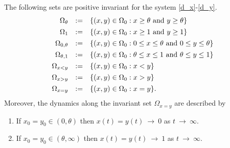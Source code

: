 \begin{lemma}
\label{th:invariant}
 The following sets are positive invariant for the system \eqref{d_x}-\eqref{d_y}.
 $$ \begin{array}{rcl}
    \Omega_{\theta}    & := & \{(x, y) \in \Omega_0 : x \geq \theta \ \hbox{and} \ y \geq \theta \} \vspace{4pt} \\
    \Omega_1           & := & \{(x, y) \in \Omega_0 : x \geq 1 \ \hbox{and} \ y \geq 1 \} \vspace{4pt} \\
    \Omega_{0, \theta} & := & \{(x, y) \in \Omega_0 : 0 \leq x \leq \theta \ \hbox{and} \ 0 \leq y \leq \theta \} \vspace{4pt} \\
    \Omega_{\theta, 1} & := & \{(x, y) \in \Omega_0 : \theta \leq x \leq 1 \ \hbox{and} \ \theta \leq y \leq 1 \} \vspace{4pt} \\
    \Omega_{x < y}     & := & \{(x, y) \in \Omega_0 : x < y \} \vspace{4pt} \\
    \Omega_{x > y}     & := & \{(x, y) \in \Omega_0 : x > y \} \vspace{4pt} \\
    \Omega_{x = y}     & := & \{(x, y) \in \Omega_0 : x = y \}. \end{array} $$
 Moreover, the dynamics along the invariant set $\Omega_{x = y}$ are described by
\begin{enumerate}
 \item If $x_0 = y_0 \in (0, \theta)$ then $x (t) = y (t) \ {{\rightarrow}} \ 0$ as $t \ {{\rightarrow}} \ \infty$. \vspace{4pt}
 \item If $x_0 = y_0 \in (\theta, \infty)$ then $x (t) = y (t) \ {{\rightarrow}} \ 1$ as $t \ {{\rightarrow}} \ \infty$.
\end{enumerate}
\end{lemma}
